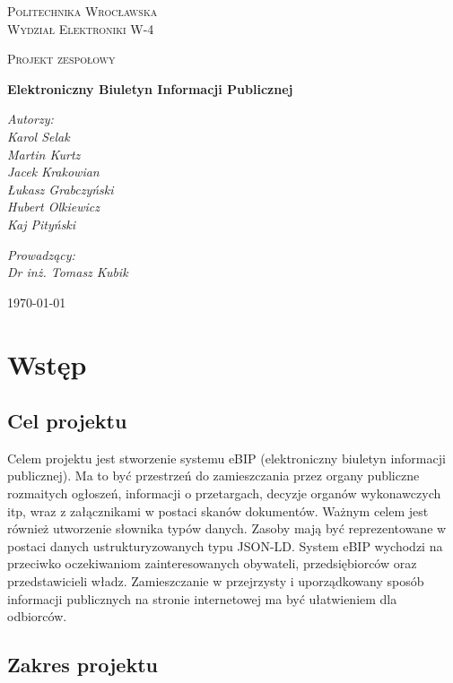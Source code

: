 \documentclass{article}
\begin{document}
\begin{titlepage}
	\centering
	{\scshape\LARGE Politechnika Wrocławska\\Wydział Elektroniki W-4 \par}
	\vspace{1cm}
	{\scshape\LARGE Projekt zespołowy\par}
	\vspace{1.5cm}
	{\huge\bfseries Elektroniczny Biuletyn Informacji Publicznej\par}
	\vspace{2cm}
	{\Large\itshape Autorzy:\\Karol Selak\\Martin Kurtz\\Jacek Krakowian\\Łukasz Grabczyński\\Hubert Olkiewicz\\Kaj Pityński\par}
	\vspace{2cm}
	{\Large\itshape Prowadzący:\\Dr inż. Tomasz Kubik\par}
	\vfill
	{\large \today\par}
\end{titlepage}
	\tableofcontents
	\newpage
\section{Wstęp}

\subsection{Cel projektu}

	Celem projektu jest stworzenie systemu eBIP (elektroniczny biuletyn informacji publicznej). Ma to być przestrzeń do zamieszczania przez organy publiczne rozmaitych ogłoszeń, informacji o przetargach, decyzje organów wykonawczych itp, wraz z załącznikami w postaci skanów dokumentów. Ważnym celem jest również utworzenie słownika typów danych. Zasoby mają być reprezentowane w postaci danych ustrukturyzowanych typu JSON-LD. System eBIP wychodzi na przeciwko oczekiwaniom zainteresowanych obywateli, przedsiębiorców oraz przedstawicieli władz. Zamieszczanie w przejrzysty i uporządkowany sposób informacji publicznych na stronie internetowej ma być ułatwieniem dla odbiorców.

\subsection{Zakres projektu}
	
\end{document}
